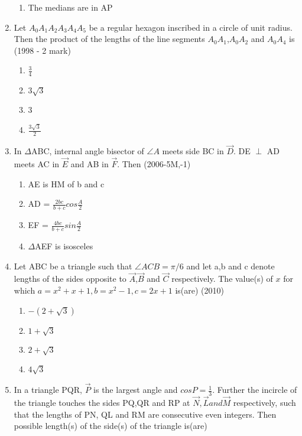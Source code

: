 \documentclass[journal,12pt,twocolumn]{IEEEtran}
\theoremstyle{remark}
\begin{document}
\begin{enumerate}
\begin{enumerate}
    \item The medians are in AP
    \end{enumerate}
    \item Let $A_{0}A_{1}A_{2}A_{3}A_{4}A_{5}$ be a regular hexagon inscribed in a circle of unit radius. Then the product of the lengths of the line segments $A_{0}A_{1}$,$A_{0}A_{2}$ and $A_{0}A_{4}$ is 
    \hfill{(1998 - 2 mark)}
    \begin{multicols}{2}
    \begin{enumerate}
    \item ${\frac{3}{4}}$
    \item $3\sqrt{3}$
    \item 3
    \item ${\frac{3\sqrt{3}}{2}}$
    \end{enumerate}
    \end{multicols}
    \item In $\Delta$ABC, internal angle bisector of $\angle A$ meets side BC in $\vec{D}$. DE $\perp$ AD meets AC in $\vec{E}$ and AB in $\vec{F}$. Then
    \hfill{(2006-5M,-1)}
    \begin{enumerate}
    \item AE is HM of b and c
    \item AD = ${\frac{2bc}{b+c}}cos{\frac{A}{2}}$
    \item EF = ${\frac{4bc}{b+c}}sin{\frac{A}{2}}$
    \item $\Delta$AEF is isosceles
    \end{enumerate}
    \item Let ABC be a triangle such that $\angle ACB = \pi/6$ and let a,b and c denote lengths of the sides opposite to $\vec{A}$,$\vec{B}$ and $\vec{C}$ respectively. The value(s) of $x$ for which $a = x^{2}+x+1, b = x^{2}-1, c = 2x+1$ is(are)
    \hfill{(2010)}
    \begin{multicols}{2}
    \begin{enumerate}
    \item $-(2+\sqrt{3})$
    \item $1+\sqrt{3}$
    \item $2+\sqrt{3}$
    \item $4\sqrt{3}$
    \end{enumerate}
    \end{multicols}
    \item In a triangle PQR, $\vec{P}$ is the largest angle and $cosP = \frac{1}{3}$. Further the incircle of the triangle touches the sides PQ,QR and RP at $\vec{N},\vec{L} and \vec{M}$ respectively, such that the lengths of PN, QL and RM are consecutive even integers. Then possible length(s) of the side(s) of the triangle is(are)

\end{enumerate}
\end{document}
